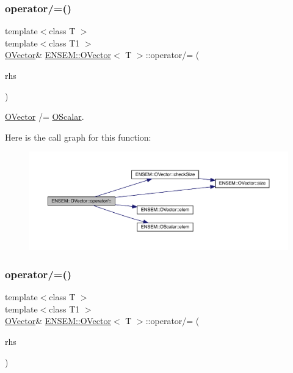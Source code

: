 \subsubsection{\texorpdfstring{operator/=()}{operator/=()}\hspace{0.1cm}{\footnotesize\ttfamily [1/4]}}
{\footnotesize\ttfamily template$<$class T $>$ \\
template$<$class T1 $>$ \\
\mbox{\hyperlink{classENSEM_1_1OVector}{O\+Vector}}\& \mbox{\hyperlink{classENSEM_1_1OVector}{E\+N\+S\+E\+M\+::\+O\+Vector}}$<$ T $>$\+::operator/= (\begin{DoxyParamCaption}\item[{const \mbox{\hyperlink{classENSEM_1_1OScalar}{O\+Scalar}}$<$ T1 $>$ \&}]{rhs }\end{DoxyParamCaption})\hspace{0.3cm}{\ttfamily [inline]}}



\mbox{\hyperlink{classENSEM_1_1OVector}{O\+Vector}} /= \mbox{\hyperlink{classENSEM_1_1OScalar}{O\+Scalar}}. 

Here is the call graph for this function\+:
\nopagebreak
\begin{figure}[H]
\begin{center}
\leavevmode
\includegraphics[width=350pt]{d0/d8d/classENSEM_1_1OVector_aa26be39a0620d0cdc1685bc2f1cc31a5_cgraph}
\end{center}
\end{figure}
\mbox{\label{classENSEM_1_1OVector_aa26be39a0620d0cdc1685bc2f1cc31a5}} 
\subsubsection{\texorpdfstring{operator/=()}{operator/=()}\hspace{0.1cm}{\footnotesize\ttfamily [2/4]}}
{\footnotesize\ttfamily template$<$class T $>$ \\
template$<$class T1 $>$ \\
\mbox{\hyperlink{classENSEM_1_1OVector}{O\+Vector}}\& \mbox{\hyperlink{classENSEM_1_1OVector}{E\+N\+S\+E\+M\+::\+O\+Vector}}$<$ T $>$\+::operator/= (\begin{DoxyParamCaption}\item[{const \mbox{\hyperlink{classENSEM_1_1OScalar}{O\+Scalar}}$<$ T1 $>$ \&}]{rhs }\end{DoxyParamCaption})\hspace{0.3cm}{\ttfamily [inline]}}



